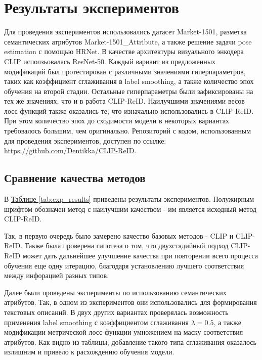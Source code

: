 \chapter{Результаты экспериментов}
\label{ch:experiments}

Для проведения экспериментов использовались датасет Market-1501, разметка семантических атрибутов Market-1501\_Attribute, а также решение задачи pose estimation с помощью HRNet. В качестве архитектуры визуального энкодера CLIP исползьовалась ResNet-50. Каждый вариант из предложенных модификаций был протестирован с различными значениями гиперпараметров, таких как коэффициент сглаживания в label smoothing, а также количество эпох обучения на второй стадии. Остальные гиперпараметры были зафиксированы на тех же значениях, что и в работа CLIP-ReID. Наилучшими значениями весов лосс-функций также оказались те, что изначально использовались в CLIP-ReID. При этом количество эпох до сходимости модели в некоторых вариантах требовалось большим, чем оригинально. Репозиторий с кодом, использованным для проведения экспериментов, доступен по ссылке: \href{https://github.com/Dentikka/CLIP-ReID}{https://github.com/Dentikka/CLIP-ReID}. 

\section{Сравнение качества методов}

В \hyperref[tab:exp_results]{Таблице \ref*{tab:exp_results}} приведены результаты экспериментов. Полужирным шрифтом обозначен метод с наилучшим качеством - им является исходный метод CLIP-ReID.

Так, в первую очередь было замерено качество базовых методов - CLIP и CLIP-ReID. Также была проверена гипотеза о том, что двухстадийный подход CLIP-ReID может дать дальнейшее улучшение качества при повторении всего процесса обучения еще одну итерацию, благодаря установлению лучшего соответствия между инфорацией разных типов. 

Далее были проведены эксперименты по использованию семантических атрибутов. Так, в одном из экспериментов они использовались для формирования текстовых описаний. В двух других вариантах проверялась возможность применения label smoothing с коэффициентом сглаживания $\lambda = 0.5$, а также модификации метрической лосс-функции умножением на маску соответствия атрибутов. Как видно из таблицы, добавление такого типа сглаживания оказалось излишним и привело к расхождению обучения модели.

